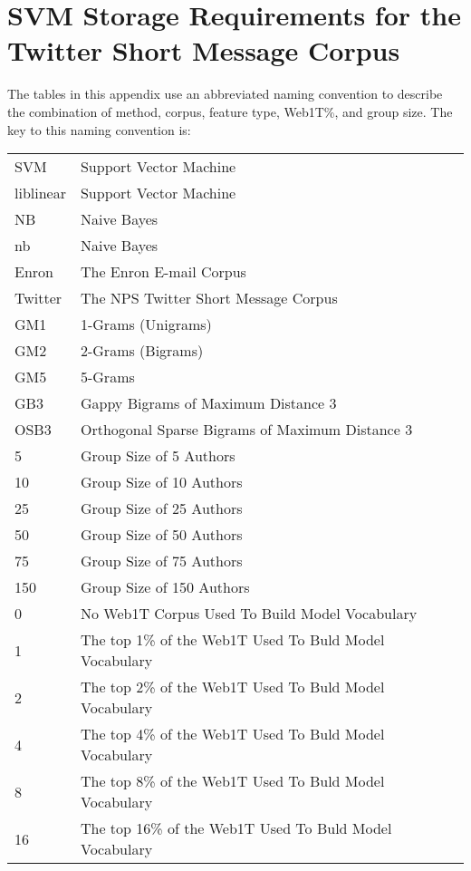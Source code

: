 \chapter{SVM Storage Requirements for the Twitter Short Message Corpus}

The tables in this appendix use an abbreviated naming convention to describe the combination of method, corpus, feature type, Web1T\%, and group size.  The key to this naming convention is:

\begin{center}
\begin{table}[htbp!]
	\begin{center}
	\begin{tabular}{ll}
	SVM & Support Vector Machine\\
	liblinear & Support Vector Machine\\
	NB & Naive Bayes\\
	nb & Naive Bayes\\
	
	Enron & The Enron E-mail Corpus\\
	Twitter & The NPS Twitter Short Message Corpus\\
	
	GM1 & 1-Grams (Unigrams)\\
	GM2 & 2-Grams (Bigrams)\\
	GM5 & 5-Grams\\
	GB3 & Gappy Bigrams of Maximum Distance 3\\
	OSB3 & Orthogonal Sparse Bigrams of Maximum Distance 3\\
		
	5 & Group Size of 5 Authors\\
	10 & Group Size of 10 Authors\\
	25 & Group Size of 25 Authors\\
	50 & Group Size of 50 Authors\\
	75 & Group Size of 75 Authors\\
	150 & Group Size of 150 Authors\\
	
	0 & No Web1T Corpus Used To Build Model Vocabulary\\
	1 & The top 1\% of the Web1T Used To Buld Model Vocabulary\\
	2 & The top 2\% of the Web1T Used To Buld Model Vocabulary\\
	4 & The top 4\% of the Web1T Used To Buld Model Vocabulary\\
	8 & The top 8\% of the Web1T Used To Buld Model Vocabulary\\
	16 & The top 16\% of the Web1T Used To Buld Model Vocabulary\\
	\end{tabular}
	\end{center}
\end{table}
\end{center}


